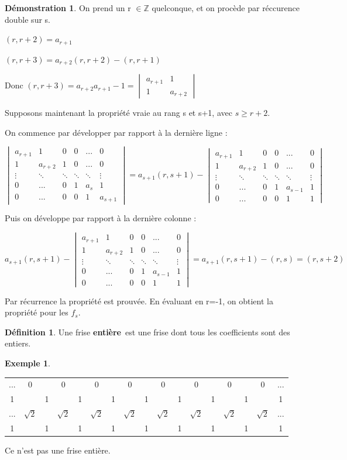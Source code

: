 \documentclass[a4paper]{article}
\theoremstyle{plain}
\theoremstyle{definition}
\newtheorem{defn}{Définition}[section]
\newtheorem{exmp}{Exemple}[section]
\theoremstyle{proof}
\newtheorem{dem}{Démonstration}
\theoremstyle{remark}
\begin{document}
\begin{dem}
On prend un r $\in \mathbb{Z}$ quelconque, et on procède par réccurence double sur s.

$(r,r+2)=a_{r+1}$

$(r,r+3)=a_{r+2}(r,r+2)-(r,r+1)$

Donc $(r,r+3)=a_{r+2}a_{r+1}-1=\begin{vmatrix}
a_{r+1}&1\\
1&a_{r+2}
\end{vmatrix}$

Supposons maintenant la propriété vraie au rang s et s+1, avec $s\ge r+2$.

On commence par développer par rapport à la dernière ligne :

$\begin{vmatrix}
a_{r+1}&1&0&0&...&0\\
1& a_{r+2}&1&0&...&0\\
\vdots&\ddots&\ddots&\ddots&\ddots&\vdots\\
0&...&0&1&a_{s}&1\\
0&...&0&0&1&a_{s+1}
\end{vmatrix}
= a_{s+1}(r,s+1)- \begin{vmatrix}
a_{r+1}&1&0&0&...&0\\
1& a_{r+2}&1&0&...&0\\
\vdots&\ddots&\ddots&\ddots&\ddots&\vdots\\
0&...&0&1&a_{s-1}&1\\
0&...&0&0&1&1
\end{vmatrix}$

Puis on développe par rapport à la dernière colonne :

$a_{s+1}(r,s+1)- \begin{vmatrix}
a_{r+1}&1&0&0&...&0\\
1& a_{r+2}&1&0&...&0\\
\vdots&\ddots&\ddots&\ddots&\ddots&\vdots\\
0&...&0&1&a_{s-1}&1\\
0&...&0&0&1&1
\end{vmatrix}=
a_{s+1}(r,s+1)-(r,s)=(r,s+2)$

Par récurrence la propriété est prouvée.
En évaluant en r=-1, on obtient la propriété pour les $f_s$.
\end{dem}
\begin{defn}
Une frise \textbf{entière}\ est une frise dont tous les coefficients sont des entiers.
\end{defn}

\begin{exmp}
\begin{center}
\begin{tabular}{ccccccccccccccccc}
...&0&&0&&0&&0&&0&&0&&0&&0&...\\
1&&1&&1&&1&&1&&1&&1&&1&&1\\
...&$\sqrt{2}$&&$\sqrt{2}$&&$\sqrt{2}$&&$\sqrt{2}$&&$\sqrt{2}$&&$\sqrt{2}$&&$\sqrt{2}$&&$\sqrt{2}$&...\\
1&&1&&1&&1&&1&&1&&1&&1&&1\\
\end{tabular}
\end{center}
Ce n'est pas une frise entière.
\end{exmp}
\end{document}
